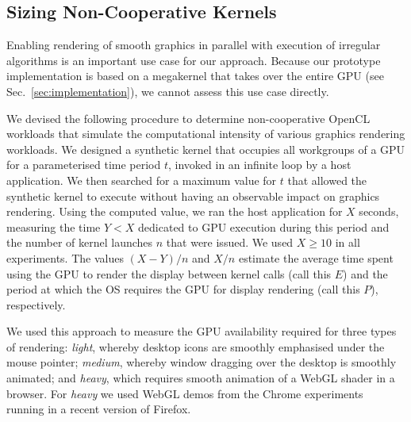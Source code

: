 \documentclass[sigconf]{acmart}
\newcommand{\mysec}{Sec.~}
\begin{document}
{\subsection{Sizing Non-Cooperative Kernels}\label{sec:sizingnoncoop}

Enabling rendering of smooth graphics in parallel with execution of irregular algorithms is an important use case for our approach.  Because our prototype implementation is based on a megakernel that takes over the entire GPU (see \mysec\ref{sec:implementation}), we cannot assess this use case directly.

We devised the following procedure to determine non-cooperative OpenCL
workloads that simulate the computational intensity of various
graphics rendering workloads.
%
We designed a synthetic kernel that occupies all workgroups of a GPU
for a parameterised time period $t$, invoked in an infinite loop by a
host application.  We then searched for a maximum value for $t$ that
allowed the synthetic kernel to execute without having an observable
impact on graphics rendering.  Using the computed value, we ran the
host application for $X$ seconds, measuring the time $Y < X$ dedicated
to GPU execution during this period and the number of kernel launches
$n$ that were issued.  We used $X \geq 10$ in all experiments.  The
values $(X-Y)/n$ and $X/n$ estimate the average time spent using the
GPU to render the display between kernel calls (call this $E$) and the
period at which the OS requires the GPU for display rendering (call
this $P$), respectively.

We used this approach to measure the GPU availability required for three
types of rendering: \emph{light}, whereby desktop icons are smoothly
emphasised under the mouse pointer; \emph{medium}, whereby window
dragging over the desktop is smoothly animated; and \emph{heavy}, which
requires smooth animation of a WebGL shader in a browser.  For
\emph{heavy} we used WebGL demos from the Chrome
experiments~\cite{chrome-experiments} running
in a recent version of Firefox.



}
\end{document}
